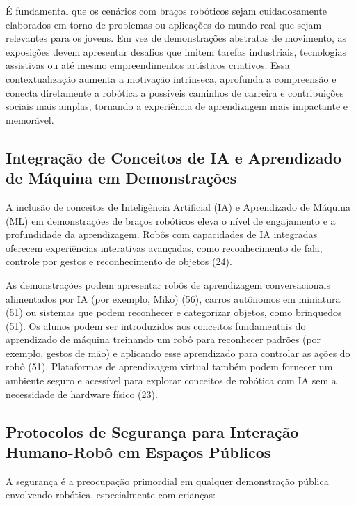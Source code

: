 \documentclass[%
  a4paper,%
  12pt,%
  fleqn,%
  english,%
  brazilian,%
]{article}
\begin{document}
É fundamental que os cenários com braços robóticos sejam cuidadosamente elaborados em torno de problemas ou aplicações do mundo real que sejam relevantes para os jovens. Em vez de demonstrações abstratas de movimento, as exposições devem apresentar desafios que imitem tarefas industriais, tecnologias assistivas ou até mesmo empreendimentos artísticos criativos. Essa contextualização aumenta a motivação intrínseca, aprofunda a compreensão e conecta diretamente a robótica a possíveis caminhos de carreira e contribuições sociais mais amplas, tornando a experiência de aprendizagem mais impactante e memorável.




\subsection{Integração de Conceitos de IA e Aprendizado de Máquina em Demonstrações}
A inclusão de conceitos de Inteligência Artificial (IA) e Aprendizado de Máquina (ML) em demonstrações de braços robóticos eleva o nível de engajamento e a profundidade da aprendizagem. Robôs com capacidades de IA integradas oferecem experiências interativas avançadas, como reconhecimento de fala, controle por gestos e reconhecimento de objetos (24).

As demonstrações podem apresentar robôs de aprendizagem conversacionais alimentados por IA (por exemplo, Miko) (56), carros autônomos em miniatura (51) ou sistemas que podem reconhecer e categorizar objetos, como brinquedos (51). Os alunos podem ser introduzidos aos conceitos fundamentais do aprendizado de máquina treinando um robô para reconhecer padrões (por exemplo, gestos de mão) e aplicando esse aprendizado para controlar as ações do robô (51). Plataformas de aprendizagem virtual também podem fornecer um ambiente seguro e acessível para explorar conceitos de robótica com IA sem a necessidade de hardware físico (23).

\subsection{Protocolos de Segurança para Interação Humano-Robô em Espaços Públicos}
A segurança é a preocupação primordial em qualquer demonstração pública envolvendo robótica, especialmente com crianças:
\end{document}
